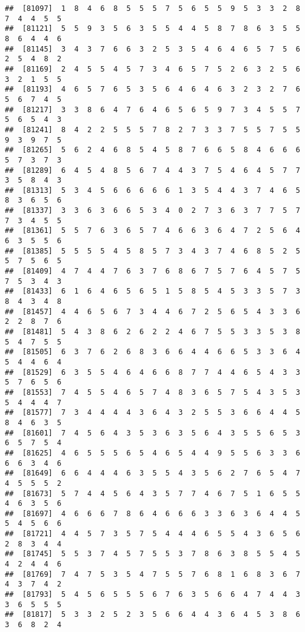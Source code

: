 \documentclass[
]{book}
\begin{document}
\begin{verbatim}
##  [81097]  1  8  4  6  8  5  5  5  7  5  6  5  5  9  5  3  3  2  8  7  4  4  5  5
##  [81121]  5  5  9  3  5  6  3  5  5  4  4  5  8  7  8  6  3  5  5  8  6  4  4  6
##  [81145]  3  4  3  7  6  6  3  2  5  3  5  4  6  4  6  5  7  5  6  2  5  4  8  2
##  [81169]  2  4  5  5  4  5  7  3  4  6  5  7  5  2  6  3  2  5  6  3  2  1  5  5
##  [81193]  4  6  5  7  6  5  3  5  6  4  6  4  6  3  2  3  2  7  6  5  6  7  4  5
##  [81217]  3  3  8  6  4  7  6  4  6  5  6  5  9  7  3  4  5  5  7  5  6  5  4  3
##  [81241]  8  4  2  2  5  5  5  7  8  2  7  3  3  7  5  5  7  5  5  9  3  9  7  5
##  [81265]  5  6  2  4  6  8  5  4  5  8  7  6  6  5  8  4  6  6  6  5  7  3  7  3
##  [81289]  6  4  5  4  8  5  6  7  4  4  3  7  5  4  6  4  5  7  7  3  5  8  4  3
##  [81313]  5  3  4  5  6  6  6  6  6  1  3  5  4  4  3  7  4  6  5  8  3  6  5  6
##  [81337]  3  3  6  3  6  6  5  3  4  0  2  7  3  6  3  7  7  5  7  7  3  4  5  5
##  [81361]  5  5  7  6  3  6  5  7  4  6  6  3  6  4  7  2  5  6  4  6  3  5  5  6
##  [81385]  5  5  5  5  4  5  8  5  7  3  4  3  7  4  6  8  5  2  5  5  7  5  6  5
##  [81409]  4  7  4  4  7  6  3  7  6  8  6  7  5  7  6  4  5  7  5  7  5  3  4  3
##  [81433]  6  1  6  4  6  5  6  5  1  5  8  5  4  5  3  3  5  7  3  8  4  3  4  8
##  [81457]  4  4  6  5  6  7  3  4  4  6  7  2  5  6  5  4  3  3  6  2  2  8  7  6
##  [81481]  5  4  3  8  6  2  6  2  2  4  6  7  5  5  3  3  5  3  8  5  4  7  5  5
##  [81505]  6  3  7  6  2  6  8  3  6  6  4  4  6  6  5  3  3  6  4  5  4  4  6  4
##  [81529]  6  3  5  5  4  6  4  6  6  8  7  7  4  4  6  5  4  3  3  5  7  6  5  6
##  [81553]  7  4  5  5  4  6  5  7  4  8  3  6  5  7  5  4  3  5  3  5  4  4  4  7
##  [81577]  7  3  4  4  4  4  3  6  4  3  2  5  5  3  6  6  4  4  5  8  4  6  3  5
##  [81601]  7  4  5  6  4  3  5  3  6  3  5  6  4  3  5  5  6  5  3  6  5  7  5  4
##  [81625]  4  6  5  5  5  6  5  4  6  5  4  4  9  5  5  6  3  3  6  6  6  3  4  6
##  [81649]  6  6  4  4  4  6  3  5  5  4  3  5  6  2  7  6  5  4  7  4  5  5  5  2
##  [81673]  5  7  4  4  5  6  4  3  5  7  7  4  6  7  5  1  6  5  5  4  6  3  5  6
##  [81697]  4  6  6  6  7  8  6  4  6  6  6  3  3  6  3  6  4  4  5  5  4  5  6  6
##  [81721]  4  4  5  7  3  5  7  5  4  4  4  6  5  5  4  3  6  5  6  2  8  3  4  4
##  [81745]  5  5  3  7  4  5  7  5  5  3  7  8  6  3  8  5  5  4  5  4  2  4  4  6
##  [81769]  7  4  7  5  3  5  4  7  5  5  7  6  8  1  6  8  3  6  7  4  3  7  4  2
##  [81793]  5  4  5  6  5  5  5  6  7  6  3  5  6  6  4  7  4  4  3  3  6  5  5  5
##  [81817]  5  3  3  2  5  2  3  5  6  6  4  4  3  6  4  5  3  8  6  3  6  8  2  4

\end{verbatim}
\end{document}
